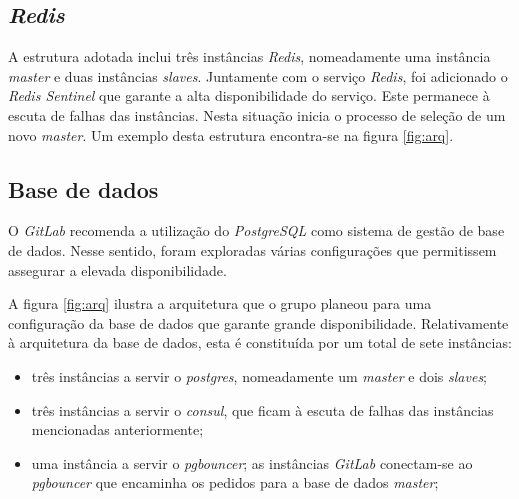 \documentclass[12pt,a4paper]{article}
\begin{document}
\subsection{\emph{Redis}}

A estrutura adotada inclui três instâncias \emph{Redis}, nomeadamente uma instância \emph{master} e duas instâncias \emph{slaves}. Juntamente com o serviço \emph{Redis}, foi adicionado o \emph{Redis Sentinel} que garante a alta disponibilidade do serviço. Este permanece à escuta de falhas das instâncias. Nesta situação inicia o processo de seleção de um novo \emph{master}. Um exemplo desta estrutura encontra-se na figura \ref{fig:arq}.

\subsection{Base de dados}



O \emph{GitLab} recomenda a utilização do \emph{PostgreSQL} como sistema de gestão de base de dados. Nesse sentido, foram exploradas várias configurações que permitissem assegurar a elevada disponibilidade.

A figura \ref{fig:arq} ilustra a arquitetura que o grupo planeou para uma configuração da base de dados que garante grande disponibilidade. Relativamente à arquitetura da base de dados, esta é constituída por um total de sete instâncias:

\begin{itemize}
    \item três instâncias a servir o \emph{postgres}, nomeadamente um \emph{master} e dois \emph{slaves};
    \item três instâncias a servir o \emph{consul}, que ficam à escuta de falhas das instâncias mencionadas anteriormente;
    \item uma instância a servir o \emph{pgbouncer}; as instâncias \emph{GitLab} conectam-se ao \emph{pgbouncer} que encaminha os pedidos para a base de dados \emph{master};
\end{itemize}
\end{document}
